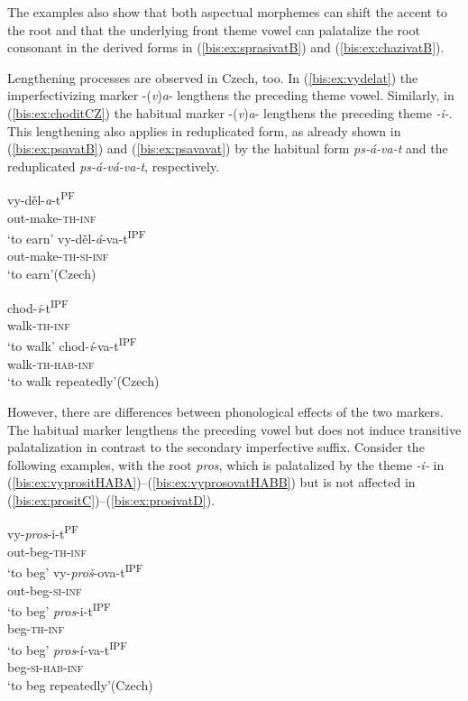 \documentclass[output=paper]{langscibook}
\begin{document}
\noindent The examples also show that both aspectual morphemes can shift the accent to the root and that the underlying front theme vowel can palatalize the root consonant in the derived forms in (\ref{bis:ex:sprasivatB}) and (\ref{bis:ex:chazivatB}).

Lengthening processes are observed in Czech, too. In (\ref{bis:ex:vydelat}) the imperfectivizing marker -(\textit{v})\textit{a}- lengthens the preceding theme vowel. Similarly, in (\ref{bis:ex:choditCZ}) the habitual marker -(\textit{v})\textit{a}- lengthens the preceding theme  \textit{-i-}. This lengthening also applies in reduplicated form, as already shown in (\ref{bis:ex:psavatB}) and (\ref{bis:ex:psavavat}) by the habitual form \textit{ps-á-va-t} and the reduplicated \textit{ps-á-vá-va-t}, respectively.

\ea\label{bis:ex:vydelat}
\ea\label{bis:ex:vydelatA} \gll 
vy-děl-\textit{a}-t\textsuperscript{PF} \\ 
out-make-\textsc{th}-\textsc{inf} \\
\glt ‘to earn’
\ex\label{bis:ex:vydelavatB} \gll vy-děl-\textit{á}-va-t\textsuperscript{IPF} \\
out-make-\textsc{th}-\textsc{si}-\textsc{inf} \\
\glt ‘to earn’\hfill (Czech)
\z
\z

\ea\label{bis:ex:choditCZ}
\ea\label{bis:ex:choditCZA} \gll 
chod-\textit{i}-t\textsuperscript{IPF} \\ 
walk-\textsc{th}-\textsc{inf} \\
\glt ‘to walk’
\ex\label{bis:ex:chodivatB} \gll chod-\textit{í}-va-t\textsuperscript{IPF} \\
walk-\textsc{th}-\textsc{hab}-\textsc{inf} \\
\glt ‘to walk repeatedly’\hfill (Czech)
\z
\z

\noindent However, there are differences between phonological effects of the two markers. The habitual marker lengthens the preceding vowel but does not induce transitive palatalization in contrast to the secondary imperfective suffix. Consider the following examples, with the root \textit{pros}, which is palatalized by the theme  \textit{-i-} in (\ref{bis:ex:vyprositHABA})--(\ref{bis:ex:vyprosovatHABB}) but is not affected in (\ref{bis:ex:prositC})--(\ref{bis:ex:prosivatD}).

\ea\label{bis:ex:vyprositHAB}
\ea\label{bis:ex:vyprositHABA} \gll vy-\textit{pros}-i-t\textsuperscript{PF} \\ 
out-beg-\textsc{th}-\textsc{inf} \\
\glt ‘to beg’
\ex\label{bis:ex:vyprosovatHABB} \gll vy-\textit{proš}-ova-t\textsuperscript{IPF} \\  
out-beg-\textsc{si}-\textsc{inf} \\
\glt ‘to beg’
\ex\label{bis:ex:prositC} \gll \textit{pros}-i-t\textsuperscript{IPF} \\ 
beg-\textsc{th}-\textsc{inf} \\
\glt ‘to beg’
\ex\label{bis:ex:prosivatD} \gll \textit{pros}-í-va-t\textsuperscript{IPF} \\  
beg-\textsc{si}-\textsc{hab}-\textsc{inf} \\
\glt ‘to beg repeatedly’\hfill (Czech)
\z\z
\end{document}
